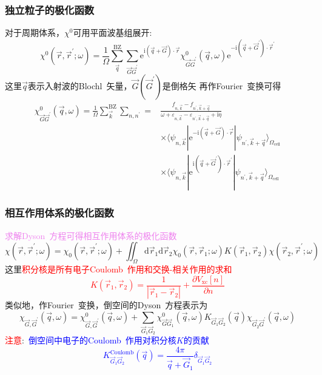 \documentclass[cjk,slidestop,compress,mathserif,blue]{beamer}
\begin{document}
\frame
{
	\frametitle{独立粒子的极化函数}
	对于周期体系，$\chi^0$可用平面波基组展开:
	\begin{displaymath}
		\chi^0(\vec r,\vec r^{\prime};\omega)=\frac1{\Omega}\sum_{\vec q}^{\mathrm{BZ}}\sum_{\vec G\vec G^{\prime}}\mathrm{e}^{\mathrm{i}(\vec q+\vec G)\cdot\vec r}\chi_{\vec G\vec G^{\prime}}^0(\vec q,\omega)\mathrm{e}^{-\mathrm{i}(\vec q+\vec G^{\prime})\cdot\vec r^{\prime}}
	\end{displaymath}
	这里$\vec q$表示入射波的\textrm{Blochl~}矢量，$\vec G(\vec G^{\prime})$是倒格矢
	\vskip 5pt
	再作\textrm{Fourier~}变换可得
	\begin{displaymath}
		\begin{aligned}
			\chi_{\vec G\vec G^{\prime}}^0(\vec q,\omega)=\frac1{\Omega}\sum_{\vec k}^{\mathrm{BZ}}\sum_{n,n^{\prime}}=&\frac{f_{n,\vec k}-f_{n^{\prime},\vec k+\vec q}}{\omega+\varepsilon_{n,\vec k}-\varepsilon_{n^{\prime},\vec k+\vec q}+\mathrm{i}\eta}\\
			&\times\langle\psi_{n,\vec k}|\mathrm{e}^{-\mathrm{i}(\vec q+\vec G)\cdot\vec r}|\psi_{n^{\prime},\vec k+\vec q}\rangle_{\Omega_{\mathrm{cell}}}\\
			&\times\langle\psi_{n,\vec k}|\mathrm{e}^{\mathrm{i}(\vec q+\vec G^{\prime})\cdot\vec r^{\prime}}|\psi_{n^{\prime},\vec k+\vec q}\rangle_{\Omega_{\mathrm{cell}}}
		\end{aligned}
	\end{displaymath}
}

\frame
{
	\frametitle{相互作用体系的极化函数}
	\textcolor{violet}{求解\textrm{Dyson~}方程可得相互作用体系的极化函数}
	\begin{displaymath}
		\chi(\vec r,\vec r^{\prime};\omega)=\chi_0(\vec r,\vec r^{\prime};\omega)+\iint_{\Omega}\mathrm{d}\vec r_1\mathrm{d}\vec r_2\chi_0(\vec r,\vec r_1;\omega)K(\vec r_1,\vec r_2)\chi(\vec r_2,\vec r^{\prime};\omega)
	\end{displaymath}
	这里\textcolor{red}{积分核是所有电子\textrm{Coulomb~}作用和交换-相关作用的求和
		\begin{displaymath}
			K(\vec r_1,\vec r_2)=\frac1{|\vec r_1-\vec r_2|}+\frac{\partial V_{\mathrm{xc}}[n]}{\partial n}
		\end{displaymath}
	}
	类似地，作\textrm{Fourier~}变换，倒空间的\textrm{Dyson~}方程表示为
	\begin{displaymath}
		\chi_{\vec G,\vec G^{\prime}}(\vec q,\omega)=\chi_{\vec G,\vec G^{\prime}}^0(\vec q,\omega)+\sum_{\vec G_1\vec G_2}\chi_{\vec G\vec G_1}^0(\vec q,\omega)K_{\vec G_1\vec G_2}(\vec q)\chi_{\vec G_2\vec G^{\prime}}(\vec q,\omega)
	\end{displaymath}
	\textcolor{red}{注意}:~\textcolor{blue}{倒空间中电子的\textrm{Coulomb~}作用对积分核$K$的贡献
	\begin{displaymath}
		K_{\vec G_1\vec G_2}^{\mathrm{Coulomb}}(\vec q)=\frac{4\pi}{\vec q+\vec G_1}\delta_{\vec G_1\vec G_2}
	\end{displaymath}}
}
\end{document}
